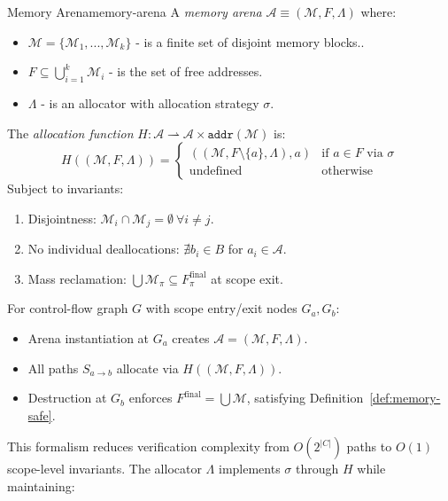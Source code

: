 \begin{definition}{Memory Arena}{memory-arena}
	A \emph{memory arena} $\mathcal{A} \equiv (\mathcal{M}, F, \Lambda)$ where:
	\begin{itemize}
		\item $\mathcal{M} = \{\mathcal{M}_1,...,\mathcal{M}_k\}$ - is a finite set of disjoint memory blocks..
		\item $F \subseteq \bigcup_{i=1}^k \mathcal{M}_i$ - is the set of free addresses.
		\item $\Lambda$ - is an allocator with allocation strategy $\sigma$.
	\end{itemize}

	The \emph{allocation function} $H: \mathcal{A} \rightharpoonup \mathcal{A} \times \texttt{addr}(\mathcal{M})$ is:
	\[
		H((\mathcal{M}, F, \Lambda)) = \begin{cases}
			((\mathcal{M}, F \setminus \{a\}, \Lambda), a) & \text{if } a \in F \text{ via } \sigma \\
			\text{undefined}                               & \text{otherwise}
		\end{cases}
	\]
	Subject to invariants:
	\begin{enumerate}
		\item Disjointness: $\mathcal{M}_i \cap \mathcal{M}_j = \emptyset\ \forall i \neq j$.
		\item No individual deallocations: $\nexists b_i \in B$ for $a_i \in \mathcal{A}$.
		\item Mass reclamation: $\bigcup \mathcal{M}_\pi \subseteq F_\pi^{\text{final}}$ at scope exit.
	\end{enumerate}
\end{definition}

For control-flow graph $G$ with scope entry/exit nodes $G_a,G_b$:
\begin{itemize}
	\item Arena instantiation at $G_a$ creates $\mathcal{A} = (\mathcal{M}, F, \Lambda)$.
	\item All paths $S_{a\rightarrow b}$ allocate via $H((\mathcal{M}, F, \Lambda))$.
	\item Destruction at $G_b$ enforces $F^{\text{final}} = \bigcup \mathcal{M}$, satisfying Definition~\ref{def:memory-safe}.
\end{itemize}

This formalism reduces verification complexity from $O(2^{|C|})$ paths to $O(1)$ scope-level invariants. The allocator $\Lambda$ implements $\sigma$ through $H$ while maintaining:


